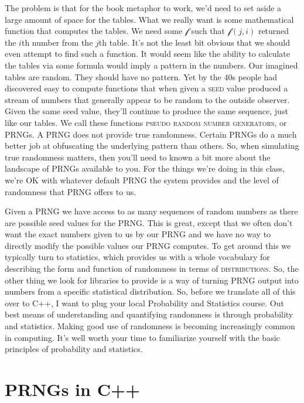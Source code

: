 \documentclass[]{tufte-handout}
\begin{document}
The problem is that for the book metaphor to work, we'd need to set aside a large amount of space for the tables. What we really want is some mathematical function that computes the tables. We need some $\mathcal{f}$ such that $\mathcal{f}(j,i)$ returned the $i$th number from the $j$th table. It's not the least bit obvious that we should even attempt to find such a function. It would seem like the ability to calculate the tables via some formula would imply a pattern in the numbers. Our imagined tables are random. They should have no pattern.  Yet by the 40s people had discovered easy to compute functions that when given a \textsc{seed} value produced a stream of numbers that generally appear to be random to the outside observer. Given the same seed value, they'll continue to produce the same sequence, just like our tables. We call these functions \textsc{pseudo random number generators}, or PRNGs.  A PRNG does not provide true randomness. Certain PRNGs do a much better job at obfuscating the underlying pattern than others.  So, when simulating true randomness matters, then you'll need to known a bit more about the landscape of PRNGs available to you. For the things we're doing in this class, we're OK with whatever default PRNG the system provides and the level of randomness that PRNG offers to us.

Given a PRNG we have access to as many sequences of random numbers as there are possible seed values for the PRNG. This is great, except that we often  don't want the exact numbers given to us by our PRNG and we have no way to directly modify the possible values our PRNG computes. To get around this we typically turn to statistics, which provides us with a whole vocabulary for describing the form and function of randomness in terms of \textsc{distributions}. So, the other thing we look for libraries to provide is a way of turning PRNG output into numbers from a specific statistical distribution. So, before we translate all of this over to C++, I want to plug your local Probability and Statistics course.  Out best means of understanding and quantifying randomness is through probability and statistics. Making good use of randomness is becoming increasingly common in computing. It's well worth your time to familiarize yourself with the basic principles of probability and statistics. 

\section{PRNGs in C++}
\end{document}
